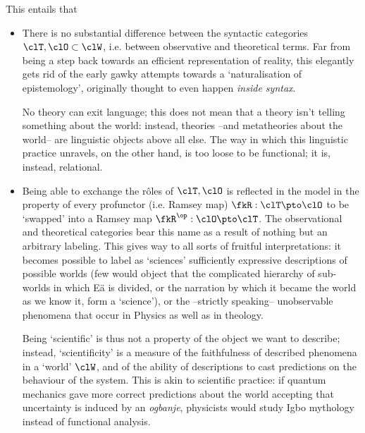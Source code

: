This entails that
\begin{itemize}
	\item There is no substantial difference between the syntactic categories $\clT,\clO\subset \clW$, i.e. between observative and theoretical terms. Far from being a step back towards an efficient representation of reality, this elegantly gets rid of the early gawky attempts towards a `naturalisation of epistemology', originally thought to even happen \emph{inside syntax}.

	      No theory can exit language; this does not mean that a theory isn't telling something about the world: instead, theories --and metatheories about the world-- are linguistic objects above all else. The way in which this linguistic practice unravels, on the other hand, is too loose to be functional; it is, instead, relational.
	\item Being able to exchange the r\^oles of $\clT,\clO$ is reflected in the model in the property of every profunctor (i.e. Ramsey map) $\fkR : \clT \pto \clO$ to be `swapped' into a Ramsey map $\fkR^\op : \clO \pto \clT$. The observational and theoretical categories bear this name as a result of nothing but an arbitrary labeling. This gives way to all sorts of fruitful interpretations: it becomes possible to label as `sciences' sufficiently expressive descriptions of possible worlds (few would object that the complicated hierarchy of sub-worlds in which Eä is divided, or the narration by which it became the world as we know it, form a `science'), or the --strictly speaking-- unobservable phenomena that occur in Physics as well as in theology.

	      Being `scientific' is thus not a property of the object we want to describe; instead, `scientificity' is a measure of the faithfulness of described phenomena in a `world' $\clW$, and of the ability of descriptions to cast predictions on the behaviour of the system. This is akin to scientific practice: if quantum mechanics gave more correct predictions about the world accepting that uncertainty is induced by an \emph{ogbanje}, physicists would study Igbo mythology instead of functional analysis.

\end{itemize}


